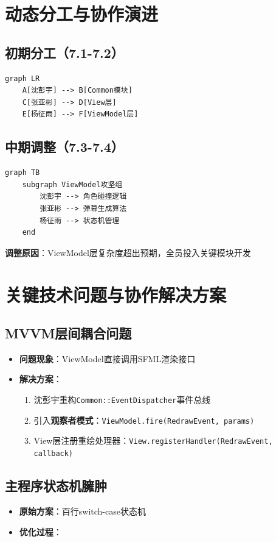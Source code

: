 \documentclass{article}
\begin{document}
\section{动态分工与协作演进}
\subsection{初期分工（7.1-7.2）}
\begin{verbatim}
graph LR
    A[沈彭宇] --> B[Common模块]
    C[张亚彬] --> D[View层]
    E[杨征雨] --> F[ViewModel层]
\end{verbatim}

\subsection{中期调整（7.3-7.4）}
\begin{verbatim}
graph TB
    subgraph ViewModel攻坚组
        沈彭宇 --> 角色碰撞逻辑
        张亚彬 --> 弹幕生成算法
        杨征雨 --> 状态机管理
    end
\end{verbatim}

\textbf{调整原因}：ViewModel层复杂度超出预期，全员投入关键模块开发

\section{关键技术问题与协作解决方案}
\subsection{MVVM层间耦合问题}
\begin{itemize}
    \item \textbf{问题现象}：ViewModel直接调用SFML渲染接口
    \item \textbf{解决方案}：
    \begin{enumerate}
        \item 沈彭宇重构\texttt{Common::EventDispatcher}事件总线
        \item 引入\textbf{观察者模式}：\texttt{ViewModel.fire(RedrawEvent, params)}
        \item View层注册重绘处理器：\texttt{View.registerHandler(RedrawEvent, callback)}
    \end{enumerate}
\end{itemize}

\subsection{主程序状态机臃肿}
\begin{itemize}
    \item \textbf{原始方案}：百行switch-case状态机
    \item \textbf{优化过程}：
\end{itemize}
\end{document}
